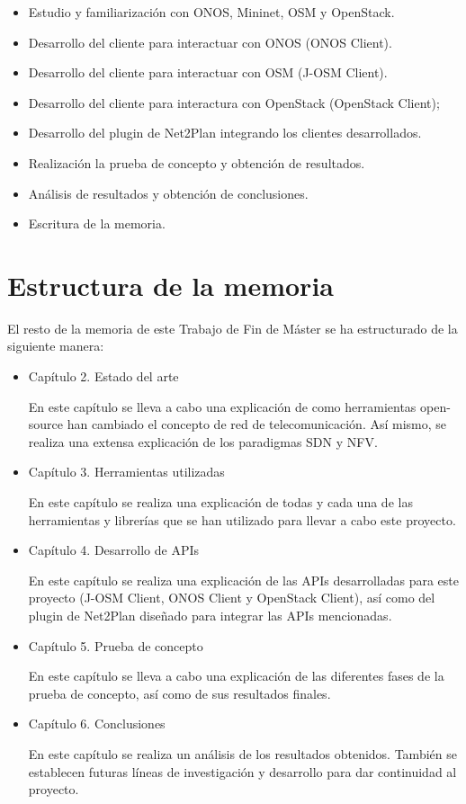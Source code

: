 \begin{itemize}
	\item Estudio y familiarización con ONOS, Mininet, OSM y OpenStack.
	\item Desarrollo del cliente para interactuar con ONOS (ONOS Client).
	\item Desarrollo del cliente para interactuar con OSM (J-OSM Client).
	\item Desarrollo del cliente para interactura con OpenStack (OpenStack Client);
	\item Desarrollo del plugin de Net2Plan integrando los clientes desarrollados.
	\item Realización la prueba de concepto y obtención de resultados.
	\item Análisis de resultados y obtención de conclusiones.
	\item Escritura de la memoria.
\end{itemize}

\clearpage

\section{Estructura de la memoria}

El resto de la memoria de este Trabajo de Fin de Máster se ha estructurado de la siguiente manera:
\begin{itemize}

	
	\item Capítulo 2. Estado del arte
	
	En este capítulo se lleva a cabo una explicación de como herramientas open-source han cambiado el concepto de red de telecomunicación. Así mismo, se realiza una extensa explicación de los paradigmas SDN y NFV.
	
	\item Capítulo 3. Herramientas utilizadas
	
	En este capítulo se realiza una explicación de todas y cada una de las herramientas y librerías que se han utilizado para llevar a cabo este proyecto.
	
	\item Capítulo 4. Desarrollo de APIs
	
	En este capítulo se realiza una explicación de las APIs desarrolladas para este proyecto (J-OSM Client, ONOS Client y OpenStack Client), así como del plugin de Net2Plan diseñado para integrar las APIs mencionadas.
	
	\item Capítulo 5. Prueba de concepto
	
	En este capítulo se lleva a cabo una explicación de las diferentes fases de la prueba de concepto, así como de sus resultados finales.
	
	\item Capítulo 6. Conclusiones
	
	En este capítulo se realiza un análisis de los resultados obtenidos. También se establecen futuras líneas de investigación y desarrollo para dar continuidad al proyecto.
	
	
\end{itemize}
\cleardoublepage
	
